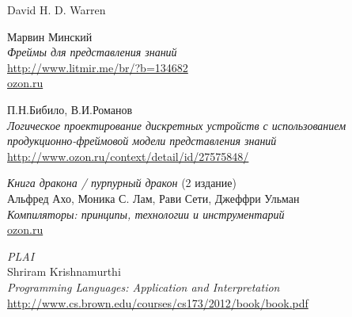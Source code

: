 \begin{thebibliography}{99}

 David H. D. Warren

Марвин Минский\\
\emph{Фреймы для представления знаний}\\
\url{http://www.litmir.me/br/?b=134682}\\ 
\href{http://www.ozon.ru/context/detail/id/31747338/}{ozon.ru}

П.Н.Бибило, В.И.Романов\\
\emph{Логическое проектирование дискретных устройств с использованием
продукционно-фреймовой модели представления знаний}\\
\url{http://www.ozon.ru/context/detail/id/27575848/}

 \textit{Книга дракона / пурпурный дракон} (2 издание)\\
Альфред Ахо, Моника С. Лам, Рави Сети, Джеффри Ульман\\
\emph{Компиляторы: принципы, технологии и инструментарий}\\
\href{https://www.ozon.ru/context/detail/id/3829076/?gclid=Cj0KCQjwzK_bBRDDARIsAFQF7zMjx6XCdudrHmuN0CRn2LL3-mydPE-VSxPZglOVxJl9V7zJ96VzBV4aAsfcEALw_wcB}{ozon.ru}

 \textit{PLAI}\\
Shriram Krishnamurthi\\
\emph{Programming Languages: Application and Interpretation}\\
\url{http://www.cs.brown.edu/courses/cs173/2012/book/book.pdf}

\end{thebibliography}